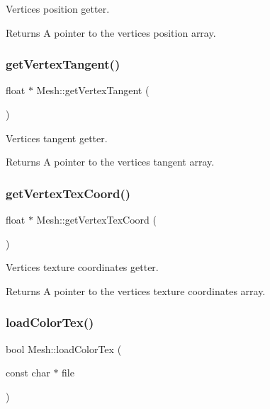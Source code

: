 Vertices position getter. 

\begin{DoxyReturn}{Returns}
A pointer to the vertices position array. 
\end{DoxyReturn}
\mbox{\label{class_mesh_ae5cd8d05ef13c4e71bea276a9783adaf}} 
\subsubsection{\texorpdfstring{get\+Vertex\+Tangent()}{getVertexTangent()}}
{\footnotesize\ttfamily float $\ast$ Mesh\+::get\+Vertex\+Tangent (\begin{DoxyParamCaption}{ }\end{DoxyParamCaption})}



Vertices tangent getter. 

\begin{DoxyReturn}{Returns}
A pointer to the vertices tangent array. 
\end{DoxyReturn}
\mbox{\label{class_mesh_ab6ba57a10fbed17d8f9dc8ec09b92657}} 
\subsubsection{\texorpdfstring{get\+Vertex\+Tex\+Coord()}{getVertexTexCoord()}}
{\footnotesize\ttfamily float $\ast$ Mesh\+::get\+Vertex\+Tex\+Coord (\begin{DoxyParamCaption}{ }\end{DoxyParamCaption})}



Vertices texture coordinates getter. 

\begin{DoxyReturn}{Returns}
A pointer to the vertices texture coordinates array. 
\end{DoxyReturn}
\mbox{\label{class_mesh_ac06b928f547c1eec3b66ae5503608c21}} 
\subsubsection{\texorpdfstring{load\+Color\+Tex()}{loadColorTex()}}
{\footnotesize\ttfamily bool Mesh\+::load\+Color\+Tex (\begin{DoxyParamCaption}\item[{const char $\ast$}]{file }\end{DoxyParamCaption})}



